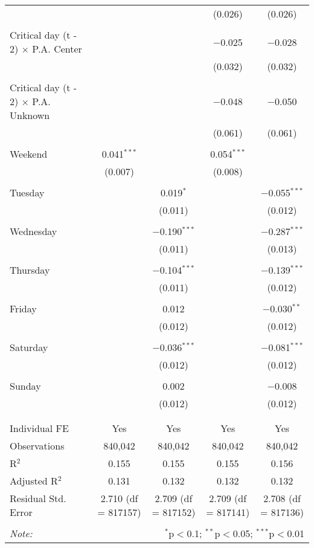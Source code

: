 \documentclass[
]{article}
\begin{document}
\begin{table}[!htbp]
{\begin{tabular}{@{\extracolsep{5pt}}lcccc}
  &  &  & (0.026) & (0.026) \\ 
  & & & & \\ 
 Critical day (t - 2) $\times$ P.A. Center &  &  & $-$0.025 & $-$0.028 \\ 
  &  &  & (0.032) & (0.032) \\ 
  & & & & \\ 
 Critical day (t - 2) $\times$ P.A. Unknown &  &  & $-$0.048 & $-$0.050 \\ 
  &  &  & (0.061) & (0.061) \\ 
  & & & & \\ 
 Weekend & 0.041$^{***}$ &  & 0.054$^{***}$ &  \\ 
  & (0.007) &  & (0.008) &  \\ 
  & & & & \\ 
 Tuesday &  & 0.019$^{*}$ &  & $-$0.055$^{***}$ \\ 
  &  & (0.011) &  & (0.012) \\ 
  & & & & \\ 
 Wednesday &  & $-$0.190$^{***}$ &  & $-$0.287$^{***}$ \\ 
  &  & (0.011) &  & (0.013) \\ 
  & & & & \\ 
 Thursday &  & $-$0.104$^{***}$ &  & $-$0.139$^{***}$ \\ 
  &  & (0.011) &  & (0.012) \\ 
  & & & & \\ 
 Friday &  & 0.012 &  & $-$0.030$^{**}$ \\ 
  &  & (0.012) &  & (0.012) \\ 
  & & & & \\ 
 Saturday &  & $-$0.036$^{***}$ &  & $-$0.081$^{***}$ \\ 
  &  & (0.012) &  & (0.012) \\ 
  & & & & \\ 
 Sunday &  & 0.002 &  & $-$0.008 \\ 
  &  & (0.012) &  & (0.012) \\ 
  & & & & \\ 
\hline \\[-1.8ex] 
Individual FE & Yes & Yes & Yes & Yes \\ 
Observations & 840,042 & 840,042 & 840,042 & 840,042 \\ 
R$^{2}$ & 0.155 & 0.155 & 0.155 & 0.156 \\ 
Adjusted R$^{2}$ & 0.131 & 0.132 & 0.132 & 0.132 \\ 
Residual Std. Error & 2.710 (df = 817157) & 2.709 (df = 817152) & 2.709 (df = 817141) & 2.708 (df = 817136) \\ 
\hline 
\hline \\[-1.8ex] 
\textit{Note:}  & \multicolumn{4}{r}{$^{*}$p$<$0.1; $^{**}$p$<$0.05; $^{***}$p$<$0.01} \\ 
\end{tabular}
} 
\end{table}
\end{document}
